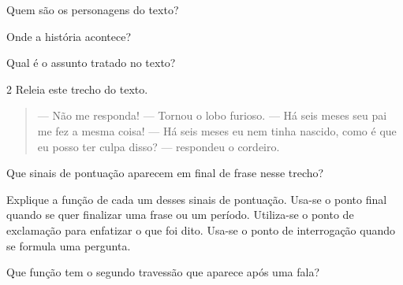 \begin{escolha}[itemsep=-5pt]
\item Quem são os personagens do texto?
\item{}


\item Onde a história acontece?
\item{}


\item Qual é o assunto tratado no texto?
\item{}
\end{escolha}

\num{2} Releia este trecho do texto.

\begin{quote}
--- Não me responda! --- Tornou o lobo furioso.
--- Há seis meses seu pai me fez a mesma coisa!
--- Há seis meses eu nem tinha nascido, como é que eu posso ter culpa disso? --- respondeu o cordeiro.
\end{quote}

\begin{escolha}[itemsep=-5pt]
\item Que sinais de pontuação aparecem em final de frase nesse trecho?
\item{}

\item Explique a função de cada um desses sinais de pontuação. Usa-se o
ponto final quando se quer finalizar uma frase ou um período. Utiliza-se
o ponto de exclamação para enfatizar o que foi dito. Usa-se o ponto de
interrogação quando se formula uma pergunta.

\item{}

\item Que função tem o segundo travessão que aparece após uma fala?
\item{}
\end{escolha}


